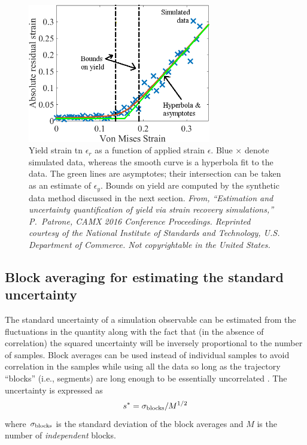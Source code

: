 \begin{figure}
\includegraphics[width=8cm]{hyperbola.png}\caption{Yield strain tn $\epsilon_r$ as a function of applied strain $\epsilon$.  Blue $\times$ denote simulated data, whereas the smooth curve is a hyperbola fit to the data.  The green lines are asymptotes; their intersection can be taken as an estimate of $\epsilon_y$.    Bounds on yield are computed by the synthetic data method discussed in the next section.  {\it From, ``Estimation and uncertainty quantification of yield via strain recovery simulations,'' P.\ Patrone, CAMX 2016 Conference Proceedings.  Reprinted courtesy of the National Institute of Standards and Technology, U.S. Department of Commerce. Not copyrightable in the United States.}}\label{fig:yield}
\end{figure}

\subsection{Block averaging for estimating the standard uncertainty}

The standard uncertainty of a simulation observable can be estimated from the fluctuations in the quantity along with the fact that (in the absence of correlation) the squared uncertainty will be inversely proportional to the number of samples.  Block averages can be used instead of individual samples to avoid correlation in the samples while using all the data so long as the trajectory ``blocks'' (i.e., segments) are long enough to be essentially uncorrelated \cite{Friedberg1970,Flyvbjerg-1989,FrenkelSmit2002,Grossfield2009}.  The uncertainty is expressed as
\begin{equation}
  s^* = \sigma_{\rm blocks}/M^{1/2}
\end{equation}
where $\sigma_{\rm blocks}$ is the standard deviation of the block averages and $M$ is the number of \emph{independent} blocks.

